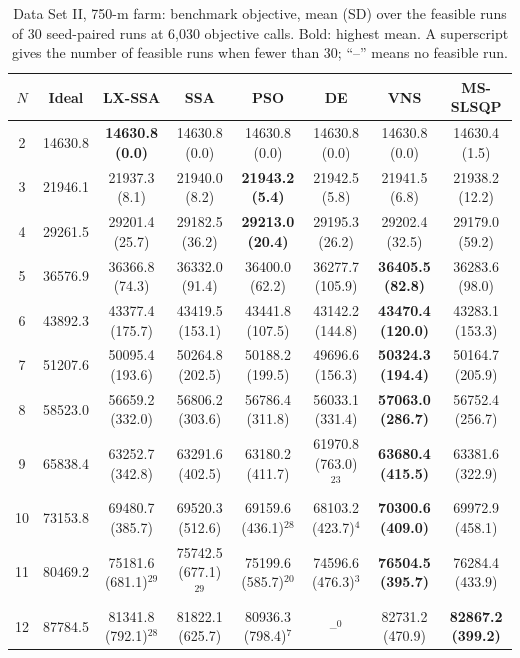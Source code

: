 \begin{table}[!t]
\centering
\caption{Data Set II, 750-m farm: benchmark objective, mean (SD) over the feasible runs of 30 seed-paired runs at 6,030 objective calls. Bold: highest mean. A superscript gives the number of feasible runs when fewer than 30; ``--'' means no feasible run.}
\label{tab:res-2-750}
\scriptsize\setlength{\tabcolsep}{3pt}
\begin{tabular}{cccccccc}
\toprule
$N$ & Ideal & LX-SSA & SSA & PSO & DE & VNS & MS-SLSQP \\
\midrule
2 & 14630.8 & \textbf{14630.8 (0.0)} & 14630.8 (0.0) & 14630.8 (0.0) & 14630.8 (0.0) & 14630.8 (0.0) & 14630.4 (1.5) \\
3 & 21946.1 & 21937.3 (8.1) & 21940.0 (8.2) & \textbf{21943.2 (5.4)} & 21942.5 (5.8) & 21941.5 (6.8) & 21938.2 (12.2) \\
4 & 29261.5 & 29201.4 (25.7) & 29182.5 (36.2) & \textbf{29213.0 (20.4)} & 29195.3 (26.2) & 29202.4 (32.5) & 29179.0 (59.2) \\
5 & 36576.9 & 36366.8 (74.3) & 36332.0 (91.4) & 36400.0 (62.2) & 36277.7 (105.9) & \textbf{36405.5 (82.8)} & 36283.6 (98.0) \\
6 & 43892.3 & 43377.4 (175.7) & 43419.5 (153.1) & 43441.8 (107.5) & 43142.2 (144.8) & \textbf{43470.4 (120.0)} & 43283.1 (153.3) \\
7 & 51207.6 & 50095.4 (193.6) & 50264.8 (202.5) & 50188.2 (199.5) & 49696.6 (156.3) & \textbf{50324.3 (194.4)} & 50164.7 (205.9) \\
8 & 58523.0 & 56659.2 (332.0) & 56806.2 (303.6) & 56786.4 (311.8) & 56033.1 (331.4) & \textbf{57063.0 (286.7)} & 56752.4 (256.7) \\
9 & 65838.4 & 63252.7 (342.8) & 63291.6 (402.5) & 63180.2 (411.7) & 61970.8 (763.0)$^{23}$ & \textbf{63680.4 (415.5)} & 63381.6 (322.9) \\
10 & 73153.8 & 69480.7 (385.7) & 69520.3 (512.6) & 69159.6 (436.1)$^{28}$ & 68103.2 (423.7)$^{4}$ & \textbf{70300.6 (409.0)} & 69972.9 (458.1) \\
11 & 80469.2 & 75181.6 (681.1)$^{29}$ & 75742.5 (677.1)$^{29}$ & 75199.6 (585.7)$^{20}$ & 74596.6 (476.3)$^{3}$ & \textbf{76504.5 (395.7)} & 76284.4 (433.9) \\
12 & 87784.5 & 81341.8 (792.1)$^{28}$ & 81822.1 (625.7) & 80936.3 (798.4)$^{7}$ & --$^{0}$ & 82731.2 (470.9) & \textbf{82867.2 (399.2)} \\
\bottomrule
\end{tabular}
\end{table}

